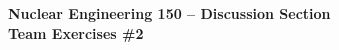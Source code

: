 \documentclass{report}
\begin{document}
\begin{center}
\textbf{\large Nuclear Engineering 150 -- Discussion Section}\\ 
\textbf{Team Exercises \#2}
\end{center}


\newpage


\newpage


\newpage


\end{document}
